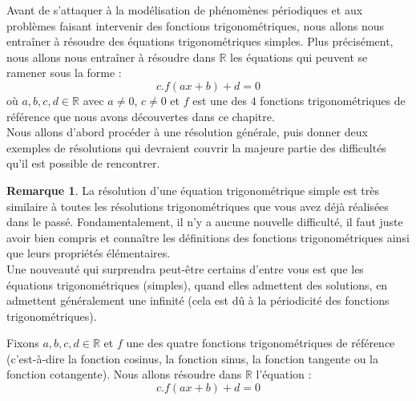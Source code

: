 \documentclass[a4paper,fontsize=13pt]{scrreprt}
\theoremstyle{plain}
\theoremstyle{definition}
\newtheorem{rema}[subsection]{Remarque}
\newcommand{\rr}{\mathbb{R}}
\begin{document}
Avant de s'attaquer à la modélisation de phénomènes périodiques et aux problèmes faisant intervenir des fonctions trigonométriques, nous allons nous entraîner à résoudre des équations trigonométriques simples. Plus précisément, nous allons nous entraîner à résoudre dans $\rr$ les équations qui peuvent se ramener sous la forme :
$$c.f(ax+b) + d =0$$
où $a,b,c,d \in \rr$ avec $a \neq 0$, $c \neq 0$ et $f$ est une des $4$ fonctions trigonométriques de référence que nous avons découvertes dans ce chapitre. \\
Nous allons d'abord procéder à une résolution générale, puis donner deux exemples de résolutions qui devraient couvrir la majeure partie des difficultés qu'il est possible de rencontrer.
\begin{rema}
La résolution d'une équation trigonométrique simple est très similaire à toutes les résolutions trigonométriques que vous avez déjà réalisées dans le passé. Fondamentalement, il n'y a aucune nouvelle difficulté, il faut juste avoir bien compris et connaître les définitions des fonctions trigonométriques ainsi que leurs propriétés élémentaires. \\
Une nouveauté qui surprendra peut-être certains d'entre vous est que les équations trigonométriques (simples), quand elles admettent des solutions, en admettent généralement une infinité (cela est dû à la périodicité des fonctions trigonométriques).
\end{rema}
Fixons $a,b,c,d \in \rr$ et $f$ une des quatre fonctions trigonométriques de référence (c'est-à-dire la fonction cosinus, la fonction sinus, la fonction tangente ou la fonction cotangente). Nous allons résoudre dans $\rr$ l'équation :
$$c.f(ax+b) + d =0$$
\end{document}
